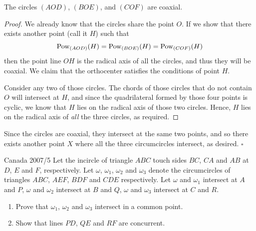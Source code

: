 \documentclass{article}
\begin{document}
\begin{claim*}
The circles $(AOD)$, $(BOE)$, and $(COF)$ are coaxial.
\end{claim*}
\begin{proof}
We already know that the circles share the point $O$. If we show that there exists another point (call it $H$) such that \[\text{Pow}_{(AOD)}(H)=\text{Pow}_{(BOE)}(H)=\text{Pow}_{(COF)}(H)\] then the point line $OH$ is the radical axis of all the circles, and thus they will be coaxial. We claim that the orthocenter satisfies the conditions of point $H$.

Consider any two of those circles. The chords of those circles that do not contain $O$ will intersect at $H$, and since the quadrilateral formed by those four points is cyclic, we know that $H$ lies on the radical axis of those two circles. Hence, $H$ lies on the radical axis of \emph{all} the three circles, as required.
\end{proof}

Since the circles are coaxial, they intersect at the same two points, and so there exists another point $X$ where all the three circumcircles intersect, as desired. $\square$

\newpage

\begin{problem}[2.37]{Canada 2007/5}
Let the incircle of triangle $ABC$ touch sides $BC$, $CA$ and $AB$ at $D$, $E$ and $F$, respectively. Let $\omega$, $\omega_1$, $\omega_2$ and $\omega_3$ denote the circumcircles of triangles $ABC$, $AEF$, $BDF$ and $CDE$ respectively. Let $\omega$ and $\omega_1$ intersect at $A$ and $P$, $\omega$ and $\omega_2$ intersect at $B$ and $Q$, $\omega$ and $\omega_3$ intersect at $C$ and $R$.

\begin{enumerate}[label=(\alph*)]
\item Prove that $\omega_1$, $\omega_2$ and $\omega_3$ intersect in a common point.
\item Show that lines $PD$, $QE$ and $RF$ are concurrent.
\end{enumerate}
\end{problem}
\end{document}
